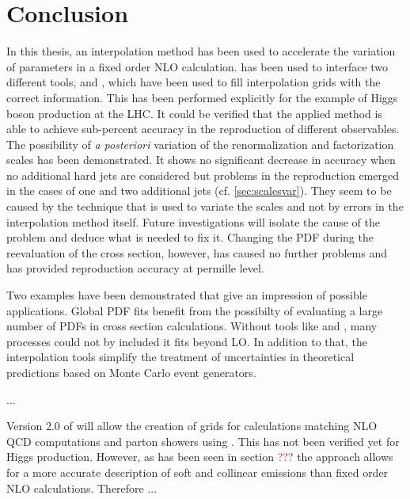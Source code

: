 
\chapter{Conclusion}
In this thesis, an interpolation method has been used to accelerate the variation of parameters in a fixed order NLO calculation.
\mcgrid{} has been used to interface two different tools, \appl{} and \fnlo{}, which have been used to fill interpolation grids with the correct information.
This has been performed explicitly for the example of Higgs boson production at the LHC.
It could be verified that the applied method is able to achieve sub-percent accuracy in the reproduction of different observables.
The possibility of \textit{a posteriori} variation of the renormalization and factorization scales has been demonstrated.
It shows no significant decrease in accuracy when no additional hard jets are considered but problems in the reproduction emerged in the cases of one and two additional jets (cf. \cref{sec:scalesvar}).
They seem to be caused by the technique that is used to variate the scales and not by errors in the interpolation method itself.
Future investigations will isolate the cause of the problem and deduce what is needed to fix it.
Changing the PDF during the reevaluation of the cross section, however, has caused no further problems and has provided reproduction accuracy at permille level.

Two examples have been demonstrated that give an impression of possible applications.
Global PDF fits benefit from the possibilty of evaluating a large number of PDFs in cross section calculations.
Without tools like \appl{} and \fnlo{}, many processes could not by included it fits beyond LO.
In addition to that, the interpolation tools simplify the treatment of uncertainties in theoretical predictions based on Monte Carlo event generators.

... 

Version 2.0 of \mcgrid{} will allow the creation of grids for calculations matching NLO QCD computations and parton showers using \mcatnlo{}.
This has not been verified yet for Higgs production.
However, as has been seen in section \textcolor{red}{???} the \mcatnlo{} approach allows for a more accurate description of soft and collinear emissions than fixed order NLO calculations.
Therefore ...


